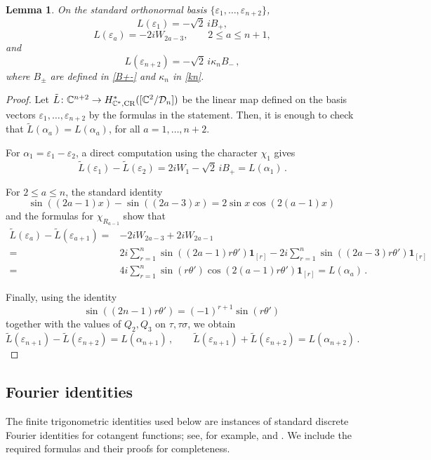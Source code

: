 \documentclass[a4paper,reqno]{amsart}
\theoremstyle{plain} %
\newtheorem{lmm}[thm]{Lemma}
\theoremstyle{definition} %
\theoremstyle{remark} %
\newcommand{\C}{\mathbb{C}}
\newcommand{\cD}{{\mathcal D}}
\newcommand{\ve}{{\varepsilon}}
\newcommand{\ka}{{\kappa}}
\newcommand{\1}{\mathds{1}}   %
\begin{document}
\begin{lmm}\label{lem:D-L-orthonormal}
On the standard orthonormal basis $\{ \ve_1, \ldots , \ve_{n+2} \}$,
\[
L(\varepsilon_1)
=
-\sqrt2\,iB_+,
\]
\[
L(\varepsilon_a)
=
-2iW_{2a-3},
\qquad
2\le a\le n+1,
\]
and
\[
L(\varepsilon_{n+2})
=
-\sqrt2\, i\kappa_nB_- \, ,
\]
where $B_\pm$ are defined in \eqref{B+-} and $\ka_n$ in \eqref{kn}.
\end{lmm}
\begin{proof}
Let $\tilde{L} \colon \C^{n+2} \to H^*_{\C^*, {\rm CR}}([\C^2/\cD_n])$ be the linear map defined  on the basis
vectors $\ve_1, \ldots , \ve_{n+2}$ by the formulas in the statement. Then,   
it is enough to check that $\tilde{L} (\alpha_a) = L(\alpha_a)$, for all $a= 1, \ldots , n+2$.

For \(\alpha_1=\varepsilon_1-\varepsilon_2\), a direct computation using the character \(\chi_1\) gives
\[
\tilde{L}(\ve_1) - \tilde{L}(\ve_2) = 2iW_1-\sqrt2\,iB_+ = L(\alpha_1) \, .
\]

For \(2\le a\le n\), the standard identity
\[
\sin((2a-1)x)-\sin((2a-3)x)
=
2\sin x\cos(2(a-1)x) \,  
\]
and the formulas for $\chi_{R_{a-1}}$ show that
\begin{align}
\tilde{L}(\ve_a) - \tilde{L}(\ve_{a+1}) = & -2iW_{2a-3} +2iW_{2a-1} \nonumber \\
= & 2i\sum_{r=1}^n \sin((2a-1)r\theta')\mathbf1_{[r]} -2i \sum_{r=1}^n \sin((2a-3)r\theta')\mathbf1_{[r]} \nonumber \\
= & 4i\sum_{r=1}^n
\sin(r\theta')
\cos(2(a-1)r\theta')\mathbf1_{[r]} = L(\alpha_{a}) \, . \nonumber
\end{align}

Finally, using the identity
\[
\sin((2n-1)r\theta')
=
(-1)^{r+1}\sin(r\theta') \, 
\]
together with the values of \( Q_2, Q_3\) on
\(\tau,\tau\sigma\), we obtain
\[
\tilde{L}(\ve_{n+1}) -\tilde{L}(\ve_{n+2}) = L(\alpha_{n+1}) \, , \qquad 
\tilde{L}(\ve_{n+1}) +\tilde{L}(\ve_{n+2}) = L(\alpha_{n+2}) \, .
\]
\end{proof}


\subsection{Fourier identities}

The finite trigonometric identities used below are instances of standard discrete Fourier identities 
for cotangent functions; see, for example, \cite[Chapter 7]{BeckRobins} and \cite{Beck}. 
We include the required formulas and their proofs for completeness.
\end{document}
